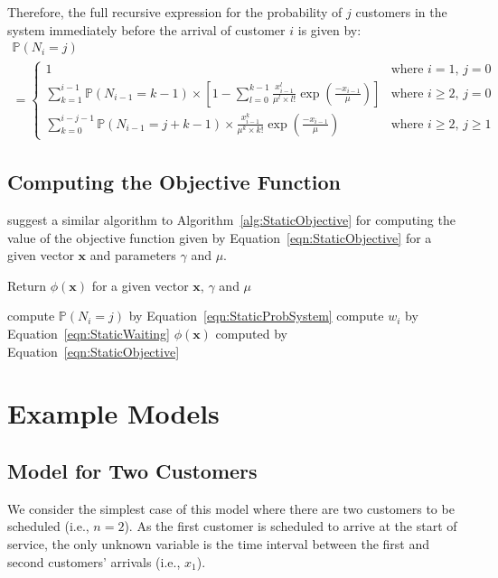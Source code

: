 Therefore, the full recursive expression for the probability of $j$ customers in the system immediately before the arrival of customer $i$ is given by:
\begin{multline}
	\mathbb{P} (N_{i} = j) \\
	= \begin{cases} 1 & \text{where $i = 1$, $j = 0$} \\ \sum_{k = 1}^{i - 1} \mathbb{P} (N_{i - 1} = k - 1) \times \left[ 1 - \sum_{l = 0}^{k - 1} \frac{x_{i - 1}^{l}}{\mu^{l} \times l!} \exp \left( \frac{- x_{i - 1}}{\mu} \right) \right] & \text{where $i \geq 2$, $j = 0$} \\ \sum_{k = 0}^{i - j - 1} \mathbb{P} (N_{i - 1} = j + k - 1) \times \frac{x_{i - 1}^{k}}{\mu^{k} \times k!} \exp \left( \frac{- x_{i - 1}}{\mu} \right) & \text{where $i \geq 2$, $j \geq 1$} \end{cases}
	\label{eqn:StaticProbSystem}
\end{multline}

\subsection{Computing the Objective Function}
\citet{Pegden} suggest a similar algorithm to Algorithm~\ref{alg:StaticObjective} for computing the value of the objective function given by Equation~\ref{eqn:StaticObjective} for a given vector $\mathbf{x}$ and parameters $\gamma$ and $\mu$.
\begin{algorithm}[htb]
\caption{Return $\phi (\mathbf{x})$ for a given vector $\mathbf{x}$, $\gamma$ and $\mu$}
\begin{algorithmic}
    		\State compute $\mathbb{P} (N_{i} = j)$ by Equation~\ref{eqn:StaticProbSystem}
    	\EndFor
    \EndFor
    	\State compute $w_{i}$ by Equation~\ref{eqn:StaticWaiting}
    \EndFor
    \State \Return $\phi (\mathbf{x})$ computed by Equation~\ref{eqn:StaticObjective}
\EndFunction
\end{algorithmic}
\label{alg:StaticObjective}
\end{algorithm}

\section{Example Models}
\subsection{Model for Two Customers}
\label{sec:StaticTwoCust}
We consider the simplest case of this model where there are two customers to be scheduled (i.e., $n = 2$). As the first customer is scheduled to arrive at the start of service, the only unknown variable is the time interval between the first and second customers' arrivals (i.e., $x_{1}$).

